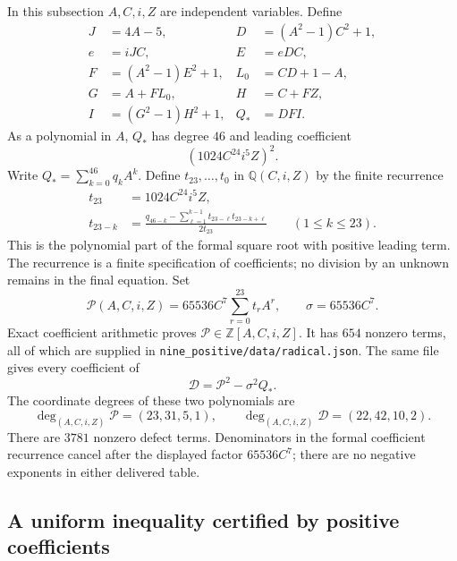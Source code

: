 In this subsection $A,C,i,Z$ are independent variables.  Define
\begin{align*}
 J&=4A-5,& D&=(A^2-1)C^2+1,\\
 e&=iJC,& E&=eDC,\\
 F&=(A^2-1)E^2+1,& L_0&=CD+1-A,\\
 G&=A+FL_0,& H&=C+FZ,\\
 I&=(G^2-1)H^2+1,& Q_*&=DFI.
\end{align*}
As a polynomial in $A$, $Q_*$ has degree $46$ and leading coefficient
\[
 (1024C^{24}i^5Z)^2.
\]
Write $Q_*=\sum_{k=0}^{46}q_k A^k$.  Define $t_{23},\ldots,t_0$ in
$\mathbb Q(C,i,Z)$ by the finite recurrence
\begin{align}
 t_{23}&=1024C^{24}i^5Z,\nonumber\\
 t_{23-k}
 &=\frac{q_{46-k}-\sum_{\ell=1}^{k-1}
                 t_{23-\ell}t_{23-k+\ell}}{2t_{23}}
       \qquad(1\leq k\leq23).                 \label{eq:majorantrecurrence}
\end{align}
This is the polynomial part of the formal square root with positive
leading term.  The recurrence is a finite specification of coefficients;
no division by an unknown remains in the final equation.
Set
\begin{equation}
 \mathcal P(A,C,i,Z)=65536C^7\sum_{r=0}^{23}t_r A^r,
 \qquad \sigma=65536C^7.                       \label{eq:majorantP}
\end{equation}
Exact coefficient arithmetic proves
$\mathcal P\in\mathbb Z[A,C,i,Z]$.  It has $654$ nonzero terms, all of
which are supplied in \texttt{nine\_positive/data/radical.json}.
The same file gives every coefficient of
\begin{equation}
 \mathcal D=\mathcal P^2-\sigma^2Q_*.
                                                    \label{eq:localdefect}
\end{equation}
The coordinate degrees of these two polynomials are
\[
 \deg_{(A,C,i,Z)}\mathcal P=(23,31,5,1),\qquad
 \deg_{(A,C,i,Z)}\mathcal D=(22,42,10,2).
\]
There are $3781$ nonzero defect terms.  Denominators in the formal
coefficient recurrence cancel after the displayed factor $65536C^7$;
there are no negative exponents in either delivered table.

\subsection{A uniform inequality certified by positive coefficients}

